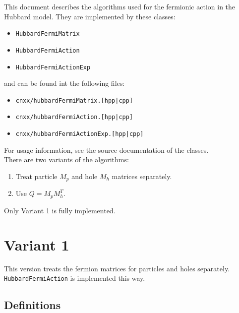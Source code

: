 \documentclass[a4paper, fleqn, twoside, notitlepage]{scrartcl}
\begin{document}
\maketitle
\vspace{-3em}
\tableofcontents

\vfill
\vspace{1em}
\noindent
This document describes the algorithms used for the fermionic action in the Hubbard model.
They are implemented by these classes:
\begin{itemize}
\item \texttt{HubbardFermiMatrix}
\item \texttt{HubbardFermiAction}
\item \texttt{HubbardFermiActionExp}
\end{itemize}
and can be found int the following files:
\begin{itemize}
\item \texttt{cnxx/hubbardFermiMatrix.[hpp|cpp]}
\item \texttt{cnxx/hubbardFermiAction.[hpp|cpp]}
\item \texttt{cnxx/hubbardFermiActionExp.[hpp|cpp]}
\end{itemize}
For usage information, see the source documentation of the classes.\\

\noindent
There are two variants of the algorithms:
\begin{enumerate}
\item Treat particle $M_p$ and hole $M_h$ matrices separately.
\item Use $Q = M_p M_h^T$.
\end{enumerate}
Only Variant 1 is fully implemented.

\clearpage
\section{Variant 1}\label{sec:variant1}

This version treats the fermion matrices for particles and holes separately.
\texttt{HubbardFermiAction} is implemented this way.

\subsection{Definitions}
\end{document}
